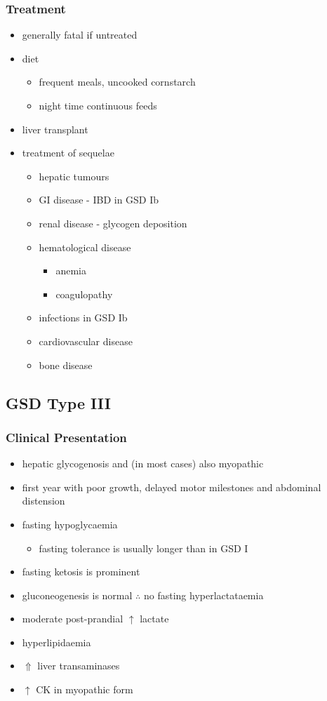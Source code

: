 \documentclass[12pt]{scrartcl}
\begin{document}
\subsubsection{Treatment}
\label{sec:org2e8d55f}
\begin{itemize}
\item generally fatal if untreated
\item diet
\begin{itemize}
\item frequent meals, uncooked cornstarch
\item night time continuous feeds
\end{itemize}
\item liver transplant
\item treatment of sequelae
\begin{itemize}
\item hepatic tumours
\item GI disease - IBD in GSD Ib
\item renal disease - glycogen deposition
\item hematological disease
\begin{itemize}
\item anemia
\item coagulopathy
\end{itemize}
\item infections in GSD Ib
\item cardiovascular disease
\item bone disease
\end{itemize}
\end{itemize}

\subsection{GSD Type III}
\label{sec:orgc219114}
\subsubsection{Clinical Presentation}
\label{sec:org69bddc7}
\begin{itemize}
\item hepatic glycogenosis and (in most cases) also myopathic
\item first year with poor growth, delayed motor milestones and abdominal
distension
\item fasting hypoglycaemia 
\begin{itemize}
\item fasting tolerance is usually longer than in GSD I
\end{itemize}
\item fasting ketosis is prominent
\item gluconeogenesis is normal \(\therefore\) no fasting hyperlactataemia
\item moderate post-prandial \(\uparrow\) lactate
\item hyperlipidaemia
\item \(\Uparrow\) liver transaminases
\item \(\uparrow\) CK in myopathic form
\end{itemize}
\end{document}
